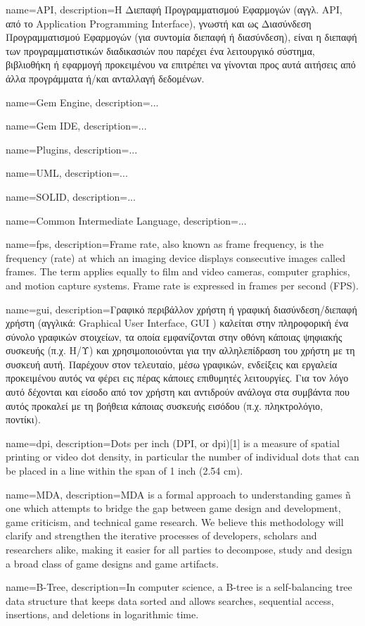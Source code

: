 {
	name=API,
	description={H Διεπαφή Προγραμματισμού Εφαρμογών (αγγλ. API, από το Application Programming Interface), γνωστή και ως Διασύνδεση Προγραμματισμού Εφαρμογών (για συντομία διεπαφή ή διασύνδεση), είναι η διεπαφή των προγραμματιστικών διαδικασιών που παρέχει ένα λειτουργικό σύστημα, βιβλιοθήκη ή εφαρμογή προκειμένου να επιτρέπει να γίνονται προς αυτά αιτήσεις από άλλα προγράμματα ή/και ανταλλαγή δεδομένων.}
}

{
	name=Gem Engine,
	description={...}
}

{
	name=Gem IDE,
	description={...}
}

{
	name=Plugins,
	description={...}
}

{
	name=UML,
	description={...}
}

{
	name=SOLID,
	description={...}
}

{
	name=Common Intermediate Language,
	description={...}
}

{
	name={fps},
	description={Frame rate, also known as frame frequency, is the frequency (rate) at which an imaging device displays consecutive images called frames. The term applies equally to film and video cameras, computer graphics, and motion capture systems. Frame rate is expressed in frames per second (FPS).}
}

{
	name={gui},
	description={Γραφικό περιβάλλον χρήστη ή γραφική διασύνδεση/διεπαφή χρήστη (αγγλικά: Graphical User Interface, GUI ) καλείται στην πληροφορική ένα σύνολο γραφικών στοιχείων, τα οποία εμφανίζονται στην οθόνη κάποιας ψηφιακής συσκευής (π.χ. Η/Υ) και χρησιμοποιούνται για την αλληλεπίδραση του χρήστη με τη συσκευή αυτή. Παρέχουν στον τελευταίο, μέσω γραφικών, ενδείξεις και εργαλεία προκειμένου αυτός να φέρει εις πέρας κάποιες επιθυμητές λειτουργίες. Για τον λόγο αυτό δέχονται και είσοδο από τον χρήστη και αντιδρούν ανάλογα στα συμβάντα που αυτός προκαλεί με τη βοήθεια κάποιας συσκευής εισόδου (π.χ. πληκτρολόγιο, ποντίκι).}		
}

{
	name={dpi},
	description={Dots per inch (DPI, or dpi)[1] is a measure of spatial printing or video dot density, in particular the number of individual dots that can be placed in a line within the span of 1 inch (2.54 cm).}
}

{
	name={MDA},
	description={MDA is a formal approach to understanding games ñ one
		which attempts to bridge the gap between game design and
		development, game criticism, and technical game research.
		We believe this methodology will clarify and strengthen the
		iterative processes of developers, scholars and researchers
		alike, making it easier for all parties to decompose, study
		and design a broad class of game designs and game
		artifacts. }	
}

{name={B-Tree},
	description={In computer science, a B-tree is a self-balancing tree data structure that keeps data sorted and allows searches, sequential access, insertions, and deletions in logarithmic time. }
}